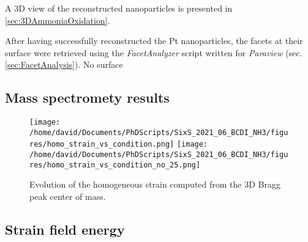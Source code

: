 A 3D view of the reconstructed nanoparticles is presented in \ref{sec:3DAmmoniaOxidation}.

After having successfully reconstructed the Pt nanoparticles, the facets at their surface were retrieved using the \textit{FacetAnalyzer} script written for \textit{Paraview} (sec. \ref{sec:FacetAnalysis}).
No surface

\subsection{Mass spectromety results}

\begin{figure}[!htb]
    \centering
    \texttt{[image: /home/david/Documents/PhDScripts/SixS\_2021\_06\_BCDI\_NH3/figures/homo\_strain\_vs\_condition.png]}
    \texttt{[image: /home/david/Documents/PhDScripts/SixS\_2021\_06\_BCDI\_NH3/figures/homo\_strain\_vs\_condition\_no\_25.png]}
    \caption{
        Evolution of the homogeneous strain computed from the 3D Bragg peak center of mass.
    }
    \label{fig:AmaterasuStrainSlices}
\end{figure}

\subsection{Strain field energy}


\parencite{Ellinger2008, Nolte2008, Gustafson2014, Hejral2016, Abuin2019, Kawaguchi2019, Hejral2021, Kim2021, Chung2021}